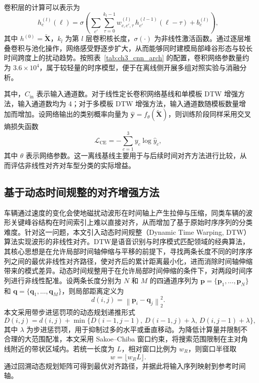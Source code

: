 \documentclass{xdupgthesis}
\begin{document}
卷积层的计算可以表示为
\begin{equation}
    h^{(l)}_{c}(\ell)=\sigma\!\left(\sum_{c'}\sum_{\tau=0}^{k_l-1} w^{(l)}_{c,c',\tau}\,h^{(l-1)}_{c'}(\ell-\tau)+b^{(l)}_{c}\right),
\end{equation}
其中 $h^{(0)}=\tilde{\mathbf{X}}$，$k_l$ 为第 $l$ 层卷积核长度，$\sigma(\cdot)$ 为非线性激活函数。通过逐层堆叠卷积与池化操作，网络感受野逐步扩大，从而能够同时建模局部峰谷形态与较长时间跨度上的扰动趋势。按照表~\ref{tab:ch3_cnn_arch} 的配置，卷积网络参数量约为 $3.6\times 10^{4}$，属于较轻量的时序模型，便于在离线侧开展多组对照实验与消融分析。

其中，$C_{\mathrm{in}}$ 表示输入通道数。对于线性定长卷积网络基线和单模板 DTW 增强方法，输入通道数均为 4；对于多模板 DTW 增强方法，输入通道数随模板数量增加而增加。设网络输出的类别概率向量为 $\hat{\mathbf{y}}=f_{\theta}(\tilde{\mathbf{X}})$，则训练阶段同样采用交叉熵损失函数
\begin{equation}
    \mathcal{L}_{\mathrm{CE}}=-\sum_{c=1}^{3} y_c \log \hat{y}_c,
\end{equation}
其中 $\theta$ 表示网络参数。这一离线基线主要用于与后续时间对齐方法进行比较，从而评估非线性对齐对车型分类的实际增益。

\subsection{基于动态时间规整的对齐增强方法}
\label{subsec:ch3_dtw_def}

车辆通过速度的变化会使地磁扰动波形在时间轴上产生拉伸与压缩，同类车辆的波形关键峰谷结构在时间索引上难以直接对齐，从而增加了基于原始时序序列的分类难度。针对这一问题，本文引入动态时间规整（Dynamic Time Warping, DTW）算法实现波形的非线性对齐。DTW是语音识别与时序模式匹配领域的经典算法，其核心思想是在允许局部时间轴伸缩与平移的前提下，寻找两条长度不同的时序序列之间的最优非线性对齐路径，使对齐后的累计距离最小化，进而消除时间轴伸缩带来的模式差异。动态时间规整用于在允许局部时间伸缩的条件下，对两段时间序列进行非线性配准。设两条长度分别为 $N$ 和 $M$ 的四通道序列为 $\mathbf{p}=\{\mathbf{p}_1,\ldots,\mathbf{p}_N\}$ 和 $\mathbf{q}=\{\mathbf{q}_1,\ldots,\mathbf{q}_M\}$，则局部距离定义为
\begin{equation}
    d(i,j)=\left\|\mathbf{p}_i-\mathbf{q}_j\right\|_2^2.
\end{equation}
本文采用带步进惩罚项的动态规划递推形式
\begin{equation}
    D(i,j)=d(i,j)+\min\big\{D(i-1,j-1),\,D(i-1,j)+\lambda,\,D(i,j-1)+\lambda\big\},
\end{equation}
其中 $\lambda$ 为步进惩罚项，用于抑制过多的水平或垂直移动。为降低计算量并限制不合理的大范围配准，本文采用 Sakoe--Chiba 窗口约束，将搜索范围限制在主对角线附近的带状区域内。若统一长度为 $L$，相对窗口比例为 $w_R$，则窗口半径取
\begin{equation}
    w=\lfloor w_R L \rfloor.
\end{equation}
通过回溯动态规划矩阵可得到最优对齐路径，并据此将输入序列映射到参考时间轴。
\end{document}

